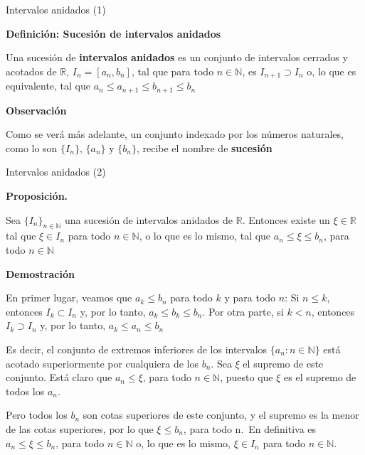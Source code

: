 \documentclass[
  ignorenonframetext,
]{beamer}
\begin{document}
\begin{frame}{Intervalos anidados (1)}
\protect\hypertarget{intervalos-anidados-1}{}

\textbf{Definición: Sucesión de intervalos anidados}

Una sucesión de \textbf{intervalos anidados} es un conjunto de
intervalos cerrados y acotados de \(\mathbb{R}\), \(I_n = [a_n,b_n]\),
tal que para todo \(n \in \mathbb{N}\), es \(I_{n+1} \supset I_n\) o, lo
que es equivalente, tal que \(a_n \leq a_{n+1} \leq b_{n+1} \leq b_n\)

\textbf{Observación}

Como se verá más adelante, un conjunto indexado por los números
naturales, como lo son \(\{I_n\}\), \(\{a_n\}\) y \(\{b_n\}\), recibe el
nombre de \textbf{sucesión}

\end{frame}

\begin{frame}{Intervalos anidados (2)}
\protect\hypertarget{intervalos-anidados-2}{}

\textbf{Proposición.}

Sea \(\{I_n\}_{n \in \mathbb{N}}\) una sucesión de intervalos anidados
de \(\mathbb{R}\). Entonces existe un \(\xi \in \mathbb{R}\) tal que
\(\xi \in I_n\) para todo \(n \in \mathbb{N}\), o lo que es lo mismo,
tal que \(a_n \leq \xi \leq b_n\), para todo \(n \in \mathbb{N}\)

\textbf{Demostración}

En primer lugar, veamos que \(a_k \leq b_n\) para todo \(k\) y para todo
\(n\): Si \(n \leq k\), entonces \(I_k \subset I_n\) y, por lo tanto,
\(a_k \leq b_k \leq b_n\). Por otra parte, si \(k < n\), entonces
\(I_k \supset I_n\) y, por lo tanto, \(a_k \leq a_n \leq b_n\)

Es decir, el conjunto de extremos inferiores de los intervalos
\(\{a_n: n \in \mathbb{N}\}\) está acotado superiormente por cualquiera
de los \(b_n\). Sea \(\xi\) el supremo de este conjunto. Está claro que
\(a_n \leq \xi\), para todo \(n \in \mathbb{N}\), puesto que \(\xi\) es
el supremo de todos los \(a_n\).

Pero todos los \(b_n\) son cotas superiores de este conjunto, y el
supremo es la menor de las cotas superiores, por lo que
\(\xi \leq b_n\), para todo n.~En definitiva es
\(a_n \leq \xi \leq b_n\), para todo \(n \in \mathbb{N}\) o, lo que es
lo mismo, \(\xi \in I_n\) para todo \(n \in \mathbb{N}\).

\end{frame}
\end{document}
